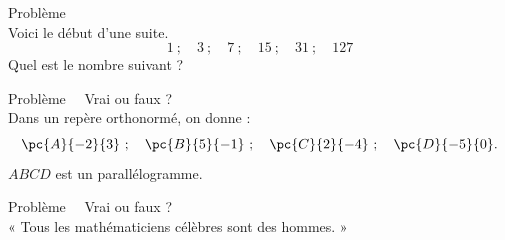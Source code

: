 \documentclass[a4paper, landscape,11pt,exos]{nsi} %
\newcounter{pbNum}
\newcommand{\pb}[1]
{
	\addtocounter{pbNum}{1}
	{\titlefont\color{UGLiBlue}\Large Problème\ \thepbNum\ \normalsize{#1}}\smallskip	
}
\begin{document}
\setlength\columnsep{4cm}
\begin{multicols}{2}
    \maketitle

    \pb{}\\
    Voici le début d'une suite.
    $$1\ ;\quad 3\ ;\quad 7\ ;\quad 15\ ;\quad 31\ ;\quad 127$$ 
    Quel est le nombre suivant ?\\
    \vfill\null
    \columnbreak
    

    \maketitle

    \pb{ Vrai ou faux ?}\\
    Dans un repère orthonormé, on donne :
    $$\pc{A}{-2}{3}\ ;\quad \pc{B}{5}{-1}\ ;\quad \pc{C}{2}{-4}\ ;\quad \pc{D}{-5}{0}.$$
    $ABCD$ est un parallélogramme.\\

    \newpage

    \maketitle

    \pb{ Vrai ou faux ?}\\
    « Tous les mathématiciens célèbres sont des hommes. »\\
    \vfill\null
    \columnbreak
    

    \maketitle


\end{multicols}
\end{document}
